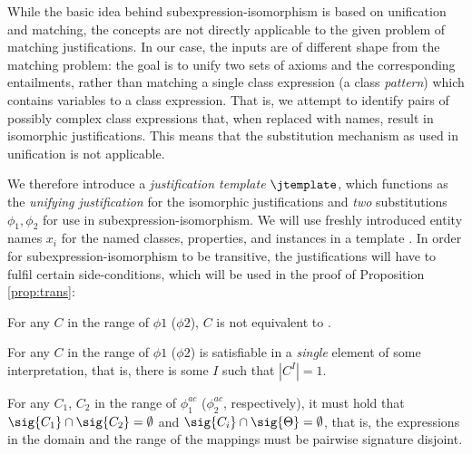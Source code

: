 While the basic idea behind subexpression-isomorphism is based on unification and matching, the concepts are not directly applicable to the given problem of matching justifications. In our case, the inputs are of different shape from the matching problem: the goal is to unify two sets of axioms and the corresponding entailments, rather than matching a single class expression (a class \emph{pattern}) which contains variables to a class expression. That is, we attempt to identify pairs of possibly complex class expressions that, when replaced with names, result in isomorphic justifications. This means that the substitution mechanism as used in unification is not applicable.

We therefore introduce a \emph{justification template} $\jtemplate$, which functions as the \emph{unifying justification} for the isomorphic justifications and \emph{two} substitutions $\phi_{1}, \phi_{2}$ for use in subexpression-isomorphism. We will use freshly introduced entity names $x_{i}$ for the named classes, properties, and instances in a template \jtemplate. In order for subexpression-isomorphism to be transitive, the justifications will have to fulfil certain side-conditions, which will be used in the proof of Proposition \ref{prop:trans}:
\begin{compactenum}[\bfseries S1]
\item For any $C$ in the range of $\phi{1}$ ($\phi{2}$), $C$ is not equivalent to \thing.
\item For any $C$ in the range of $\phi{1}$ ($\phi{2}$) is satisfiable in a \emph{single} element of some interpretation, that is, there is some $I$ such that $\left|C^{I} \right| = 1$.
\item For any $C_{1}$, $C_{2}$ in the range of $\phi^{ac}_{1}$ ($\phi^{ac}_{2}$, respectively), it must hold that $\sig{C_{1}} \cap \sig{C_{2}} = \emptyset$ and $\sig{C_{i}} \cap \sig{\Theta} = \emptyset$, that is, the expressions in the domain and the range of the mappings must be pairwise signature disjoint.
\end{compactenum}

